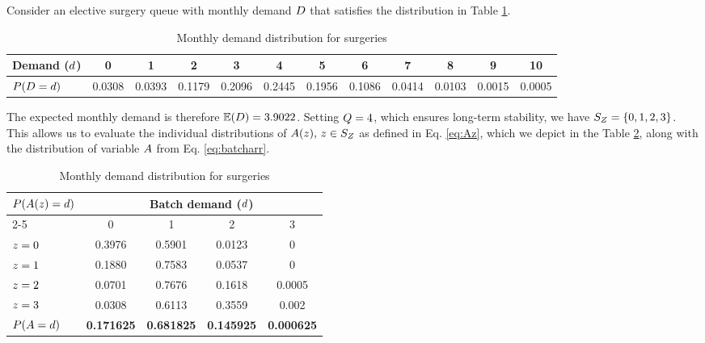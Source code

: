\begin{ex}
Consider an elective surgery queue with monthly demand $D$ that satisfies the distribution in Table \ref{tab:demprob}.
%
\begin{center}
\begin{table}[h!]
\caption{Monthly demand distribution for surgeries} \label{tab:demprob}
\scriptsize{
\begin{tabular}{|l|c|c|c|c|c|c|c|c|c|c|c|} \hline \hline
\textbf{Demand ($d$)} & 0 & 1 & 2 & 3 & 4 & 5 & 6 & 7 & 8 & 9 & 10 \\ \hline
$P(D=d)$ & 0.0308 & 0.0393 & 0.1179 & 0.2096 & 0.2445 & 0.1956 & 0.1086 & 0.0414 & 0.0103 & 0.0015 & 0.0005 \\ \hline
\end{tabular}
}
\end{table}
\end{center}
%
The expected monthly demand is therefore $\mathbb{E}(D) = 3.9022$. Setting $Q = 4$, which ensures long-term stability, we have $S_{Z_{}{}} = \{0, 1, 2, 3\}$. This allows us to evaluate the individual distributions of $A(z), \, z \in S_{Z_{}}$ as defined in Eq. \eqref{eq:Az}, which we depict in the Table \ref{tab:dembatches}, along with the distribution of variable $A$ from Eq. \eqref{eq:batcharr}.


\begin{table}[h!]
\centering \caption{Monthly demand distribution for surgeries} \label{tab:dembatches}
\scriptsize{
\begin{tabular}{|l|c|c|c|c|} \hline \hline
$P(A(z) = d) $ & \multicolumn{4}{|c|}{\textbf{Batch demand ($d$)}} \\ \cline{2-5}
  & 0 & 1 & 2 & 3 \\ \hline
$z=0$   & 0.3976 & 0.5901 & 0.0123 & 0 \\ \hline
$z=1$   & 0.1880 & 0.7583 & 0.0537 & 0 \\ \hline
$z=2$   & 0.0701 & 0.7676 & 0.1618 & 0.0005 \\ \hline
$z=3$   & 0.0308 & 0.6113 & 0.3559 & 0.002 \\ \hline
\textbf{$P(A=d)$} & \textbf{0.171625} &  \textbf{0.681825} & \textbf{0.145925} &  \textbf{0.000625} \\ \hline
\end{tabular}
}
\end{table}


\end{ex}
